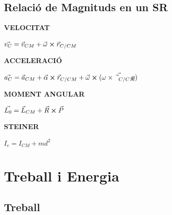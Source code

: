 \documentclass[11pt]{article}
\begin{document}
\begin{tcolorbox}[
    colback=white,
    colframe=black,
    boxrule=0.8pt,
    arc=0pt
]
\begin{itemize}
\end{itemize}










\end{tcolorbox}

\subsection{Relació de Magnituds en un SR}

\begin{tcolorbox}[
    colback=white,
    colframe=black,
    boxrule=0.8pt,
    arc=0pt
]

\textbf{VELOCITAT}

$\vec{v_C} = \vec{v}_{CM} + \vec{\omega}\cross \vec{r}_{C/CM}$

\textbf{ACCELERACIÓ}

$\vec{a_C} = \vec{a}_{CM} + \vec{\alpha}\cross \vec{r}_{C/CM} + \vec{\omega} \cross (\vec{\omega \cross \vec{r}_{C/CM}})$

\textbf{MOMENT ANGULAR}

$\vec{L_0} = \vec{L}_{CM} + \vec{R} \cross \vec{P}$

\textbf{STEINER}

$I_e = I_{CM} + md^2$

\end{tcolorbox}

\section{Treball i Energia}

\subsection{Treball}
\end{document}
